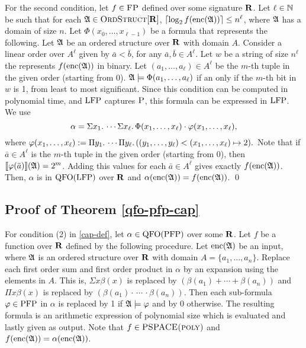 For the second condition, let $f\in \text{\sc FP}$ defined over some signature $\mathbf{R}$. Let $\ell\in\mathbb{N}$ be such that for each $\mathfrak{A}\in\text{\sc OrdStruct}[\mathbf{R}]$, $\lceil\log_2 f({\rm enc}(\mathfrak{A})) \rceil \leq n^\ell$, where $\mathfrak{A}$ has a domain of size $n$. Let $\Phi(x_0,\ldots,x_{\ell-1})$ be a formula that represents the following. Let $\mathfrak{A}$ be an ordered structure over $\mathbf{R}$ with domain $A$. Consider a linear order over $A^{\ell}$ given by $\bar{a} < \bar{b}$, for any $\bar{a},\bar{b}\in A^{\ell}$. Let $w$ be a string of size $n^{\ell}$ the represents $f({\rm enc}(\mathfrak{A}))$ in binary. Let $(a_1,\ldots,a_{\ell})\in A^{\ell}$ be the $m$-th tuple in the given order (starting from 0). $\mathfrak{A}\models\Phi(a_1,\ldots,a_{\ell})$ if an only if the $m$-th bit in $w$ is 1, from least to most significant. Since this condition can be computed in polynomial time, and ${\rm LFP}$ captures $\text{\sc P}$, this formula can be expressed in ${\rm LFP}$. We use
$$
\alpha = \Sigma{x_1}.\, \cdots \Sigma{x_{\ell}}.\, \Phi(x_1,\ldots,x_{\ell})\cdot\varphi(x_1,\ldots,x_{\ell}),
$$
where $\varphi(x_1,\ldots,x_{\ell}) := \Pi{y_1}.\,\cdots\Pi{y_{\ell}}.\,((y_1,\ldots,y_{\ell}) < (x_1,\ldots,x_{\ell}) \mapsto 2).$ Note that if $\bar{a} \in A^{\ell}$ is the $m$-th tuple in the given order (starting from 0), then ${\llbracket{}{\varphi(\bar{a})}\rrbracket}(\mathfrak{A}) = 2^{m}$. Adding this values for each $\bar{a}\in A^{\ell}$ gives exactly $f({\rm enc}(\mathfrak{A}))$. Then, $\alpha$ is in ${\rm QFO}({\rm LFP})$ over $\mathbf{R}$ and $\alpha({\rm enc}(\mathfrak{A})) = f({\rm enc}(\mathfrak{A}))$. \qed

\subsection{Proof of Theorem \ref{qfo-pfp-cap}}


For condition (2) in \ref{cap-def}, let $\alpha\in{\rm QFO}({\rm PFP})$ over some $\mathbf{R}$. Let $f$ be a function over $\mathbf{R}$ defined by the following procedure. Let ${\rm enc}(\mathfrak{A})$ be an input, where $\mathfrak{A}$ is an ordered structure over $\mathbf{R}$ with domain $A = \{a_1,\ldots,a_n\}$. Replace each first order sum and first order product in $\alpha$ by an expansion using the elements in $A$. This is, $\Sigma x \beta(x)$ is replaced by $(\beta(a_1)+\cdots+\beta(a_n))$ and $\Pi x \beta(x)$ is replaced by $(\beta(a_1)\cdot\,\cdots\,\cdot\beta(a_n))$. Then each sub-formula $\varphi\in{\rm PFP}$ in $\alpha$ is replaced by 1 if $\mathfrak{A}\models\varphi$ and by 0 otherwise. The resulting formula is an arithmetic expression of polynomial size which is evaluated and lastly given as output. Note that $f\in\text{\sc PSPACE(poly)}$ and $f({\rm enc}(\mathfrak{A})) = \alpha({\rm enc}(\mathfrak{A}))$.


